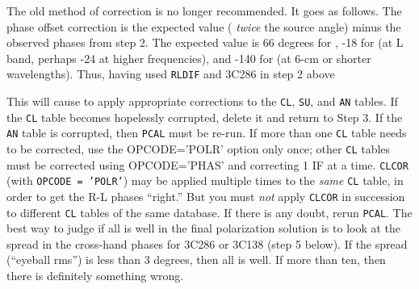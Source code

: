      The old method of correction is no longer recommended.  It goes
as follows.  The phase offset correction is the expected value ({\it
twice\/} the source  angle) minus the observed
phases from step 2.  The expected value is 66 degrees for
, -18 for  (at L band, perhaps -24 at higher
frequencies), and -140 for  (at 6-cm or shorter
wavelengths).  Thus, having used {\tt RLDIF} and  3C286 in step 2
above

      This will cause {\tt {}} to apply appropriate
corrections to the {\tt CL}, {\tt SU}, and {\tt AN} tables.  If the
{\tt CL} table becomes hopelessly corrupted, delete it and return to
Step 3. If the {\tt AN} table is corrupted, then {\tt PCAL} must be
re-run. If more than one {\tt CL} table needs to be corrected, use the
{\us OPCODE='POLR'} option only once; other {\tt CL} tables must be
corrected using {\us OPCODE='PHAS'} and correcting 1 IF at a time.
{\tt CLCOR} (with {\tt OPCODE = 'POLR'}) may be applied multiple times
to the {\it same\/} {\tt CL} table, in order to get the R-L phases
``right.''  But you must {\it not\/} apply {\tt CLCOR} in succession to
different {\tt CL} tables of the same database.  If there is any
doubt, rerun \hbox{{\tt PCAL}}.  The best way to judge if all is well
in the final polarization solution is to look at the spread in the
cross-hand phases for 3C286 or 3C138 (step 5 below).  If the spread
(``eyeball rms'') is less than 3 degrees, then all is well.  If more
than ten, then there is definitely something wrong.

